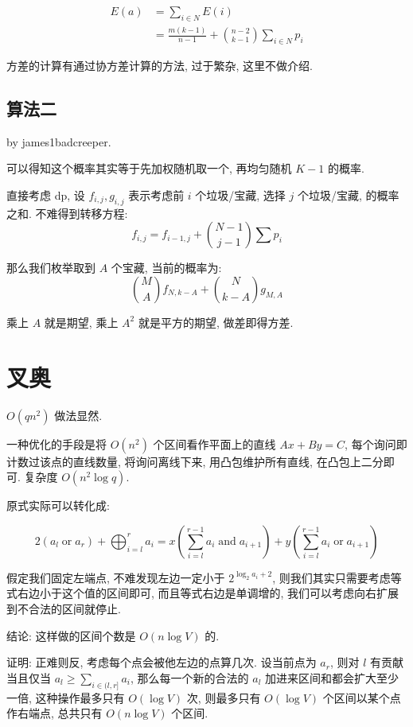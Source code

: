 \documentclass[a4paper, 12pt]{ctexart}
\begin{document}
\begin{align}
    E(a) &= \sum_{i \in N} E(i)\\
    &= \frac{m(k - 1)}{n - 1} + \binom{n - 2}{k - 1}\sum_{i \in N} p_i
\end{align}

方差的计算有通过协方差计算的方法, 过于繁杂, 这里不做介绍.

\subsection{算法二}

by james1badcreeper.

可以得知这个概率其实等于先加权随机取一个, 再均匀随机 $K - 1$ 的概率.

直接考虑 dp, 设 $f_{i,j}, g_{i, j}$ 表示考虑前 $i$ 个垃圾/宝藏, 选择 $j$ 个垃圾/宝藏, 的概率之和.
不难得到转移方程:
$$
f_{i, j} = f_{i - 1, j} + \binom{N - 1}{j - 1}\sum p_i
$$

那么我们枚举取到 $A$ 个宝藏, 当前的概率为:
$$
\binom{M}{A} f_{N, k - A} + \binom{N}{k - A} g_{M, A}
$$

乘上 $A$ 就是期望, 乘上 $A^2$ 就是平方的期望, 做差即得方差.

\section{叉奥}

$O(qn^2)$ 做法显然.

一种优化的手段是将 $O(n ^ 2)$ 个区间看作平面上的直线 $Ax + By = C$, 每个询问即计数过该点的直线数量, 将询问离线下来, 用凸包维护所有直线, 在凸包上二分即可.
复杂度 $O(n^2 \log q)$.

原式实际可以转化成:

$$
2(a_l\operatorname{or}a_r)+\bigoplus_{i=l}^ra_i=x(\sum_{i=l}^{r-1}a_i\operatorname{and}a_{i+1})+y(\sum_{i=l}^{r-1}a_i\operatorname{or}a_{i+1})
$$

假定我们固定左端点, 不难发现左边一定小于 $2^{\log_2 a_i + 2}$, 则我们其实只需要考虑等式右边小于这个值的区间即可, 而且等式右边是单调增的, 我们可以考虑向右扩展到不合法的区间就停止.

结论: 这样做的区间个数是 $O(n \log V)$ 的.

证明: 正难则反, 考虑每个点会被他左边的点算几次. 设当前点为 $a_r$, 则对 $l$ 有贡献当且仅当 $a_l \ge \sum_{i \in (l, r]}a_i$, 那么每一个新的合法的 $a_l$ 加进来区间和都会扩大至少一倍, 这种操作最多只有 $O(\log V)$ 次, 则最多只有 $O(\log V)$ 个区间以某个点作右端点, 总共只有 $O(n \log V)$ 个区间.
\end{document}
